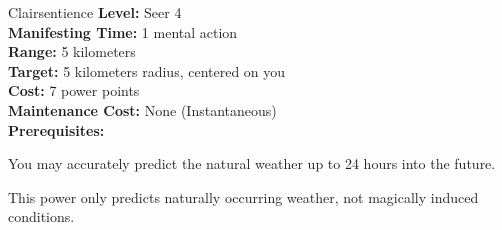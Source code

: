 {Clairsentience}
{
	\textbf{Level:}
	Seer 4\\
	\textbf{Manifesting Time:}
	1 mental action\\
	\textbf{Range:}
	5 kilometers\\
	\textbf{Target:}
	5 kilometers radius, centered on you\\
	\textbf{Cost:}
	7 power points\\
	\textbf{Maintenance Cost:}
	None (Instantaneous)\\
	\textbf{Prerequisites:}
	\\
}
{
	You may accurately predict the natural weather up to 24 hours into the future.

	This power only predicts naturally occurring weather, not magically induced conditions.
}